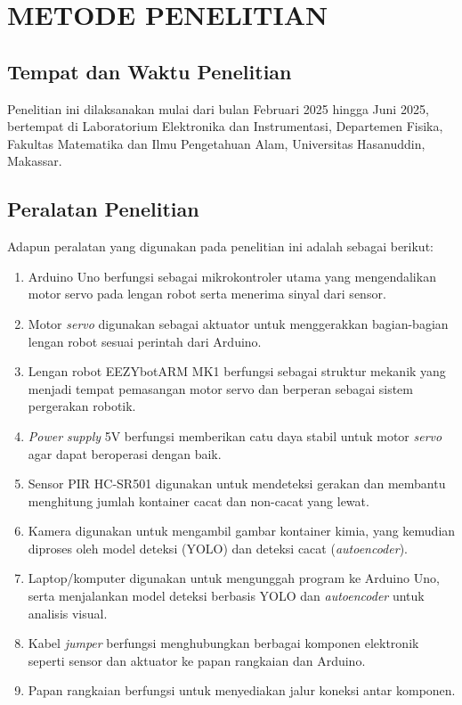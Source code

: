 \chapter{METODE PENELITIAN}
\section{Tempat dan Waktu Penelitian}
Penelitian ini dilaksanakan mulai dari bulan Februari 2025 hingga Juni
2025, bertempat di Laboratorium Elektronika dan Instrumentasi,
Departemen Fisika, Fakultas Matematika dan Ilmu Pengetahuan Alam,
Universitas Hasanuddin, Makassar.

\vspace{1em}

\section{Peralatan Penelitian}
Adapun peralatan yang digunakan pada penelitian ini adalah sebagai berikut:
\begin{enumerate}
  \item Arduino Uno berfungsi sebagai mikrokontroler utama yang
    mengendalikan motor servo pada lengan robot serta menerima sinyal
    dari sensor.
  \item Motor \textit{servo} digunakan sebagai aktuator untuk menggerakkan
    bagian-bagian lengan robot sesuai perintah dari Arduino.
  \item Lengan robot EEZYbotARM MK1 berfungsi sebagai struktur
    mekanik yang menjadi tempat pemasangan motor servo dan berperan
    sebagai sistem pergerakan robotik.
  \item \textit{Power supply} 5V berfungsi memberikan catu daya stabil untuk
    motor \textit{servo} agar dapat beroperasi dengan baik.
  \item Sensor PIR HC-SR501 digunakan untuk mendeteksi gerakan dan membantu
    menghitung jumlah kontainer cacat dan non-cacat yang lewat.
  \item Kamera digunakan untuk mengambil gambar kontainer kimia, yang
    kemudian diproses oleh model deteksi (YOLO) dan deteksi cacat
    (\textit{autoencoder}).
  \item Laptop/komputer digunakan untuk mengunggah program ke Arduino
    Uno, serta menjalankan model deteksi berbasis YOLO dan
    \textit{autoencoder} untuk analisis visual.
  \item Kabel \textit{jumper} berfungsi menghubungkan berbagai komponen
    elektronik seperti sensor dan aktuator ke papan rangkaian dan
    Arduino.
  \item Papan rangkaian berfungsi untuk menyediakan jalur koneksi
    antar komponen.
\end{enumerate}

